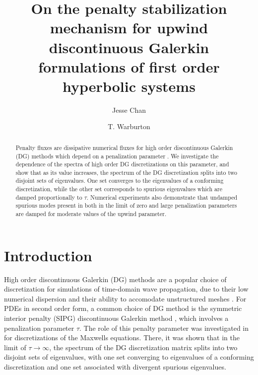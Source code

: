 \documentclass[preprint,10pt]{elsarticle}
\date{}
\newcommand{\note}[1]{#1}
\begin{document}
\begin{frontmatter}
\title{On the \note{penalty stabilization mechanism for upwind discontinuous Galerkin formulations of first order hyperbolic systems}}

\author[rice]{Jesse Chan}
\author[vt]{T. Warburton}
\address[rice]{Department of Computational and Applied Mathematics, Rice University, 6100 Main St, Houston, TX, 77005}
\address[vt]{Department of Mathematics, Virginia Tech, 225 Stanger Street, Blacksburg, VA 24061-0123}

\address{}

\begin{abstract}
Penalty fluxes are dissipative numerical fluxes for high order discontinuous Galerkin (DG) methods which depend on a penalization parameter \cite{warburton2013low, ye2016discontinuous}.  We investigate the dependence of the spectra of high order DG discretizations on this parameter, and show that as its value increases, the \note{spectrum} of the DG discretization splits into two disjoint sets of eigenvalues.  One set converges to the eigenvalues of a conforming discretization, while the other set corresponds to spurious eigenvalues which are damped proportionally to $\tau$.  Numerical experiments also demonstrate that undamped spurious modes present in both in the limit of zero and large penalization parameters are damped for moderate values of the upwind parameter.  
\end{abstract}
\end{frontmatter}


\section{Introduction}

High order discontinuous Galerkin (DG) methods are a popular choice of discretization for simulations of time-domain wave propagation, due to their low numerical dispersion and their ability to accomodate unstructured meshes \cite{grote2006discontinuous,hesthaven2007nodal}.  For PDEs in second order form, a common choice of DG method is the symmetric interior penalty (SIPG) discontinuous Galerkin method \cite{riviere2008discontinuous}, which involves a penalization parameter $\tau$.  The role of this penalty parameter was investigated in \cite{Warburton20063205} for discretizations of the Maxwells equations.  There, it was shown that in the limit of $\tau\rightarrow\infty$, the \note{spectrum} of the DG discretization matrix splits into two disjoint sets of eigenvalues, with one set converging to eigenvalues of a conforming discretization and one set associated with divergent spurious eigenvalues.  
\end{document}
